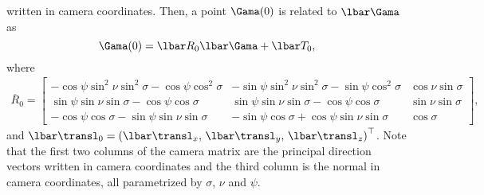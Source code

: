 written in camera coordinates.  Then, a point $\Gama(0)$ is related to $\lbar \Gama$ as
\begin{equation}
\Gama(0) = \lbar R_0\lbar \Gama + \lbar T_0,
\end{equation}
where
\begin{align}
\overline R_0 = 
\begin{bmatrix}
-\cos\psi\sin^2\nu\sin^2\sigma - \cos\psi\cos^2\sigma
&-\sin\psi\sin^2\nu\sin^2\sigma - \sin\psi\cos^2\sigma & \cos\nu\sin\sigma\\
\sin\psi\sin\nu\sin\sigma - \cos\psi\cos\sigma        &\sin\psi\sin\nu\sin\sigma - \cos\psi\cos\sigma        & \sin\nu\sin\sigma\\
-\cos\psi\cos\sigma-\sin\psi\sin\nu\sin\sigma         &-\sin\psi\cos\sigma + \cos\psi\sin\nu\sin\sigma       & \cos\sigma
\end{bmatrix},
\end{align}
and $\lbar\transl_0 = \left( \lbar\transl_x,\,\lbar\transl_y,\,\lbar\transl_z \right)^\top$.
Note that  the first two columns of the camera matrix are the principal
direction vectors written in camera coordinates and the third column is the
normal in camera coordinates, all parametrized by $\sigma$, $\nu$ and $\psi$.

